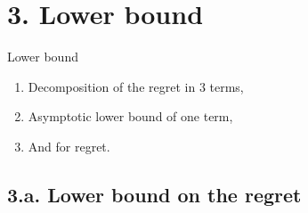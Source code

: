 \documentclass[12pt,english,ignorenonframetext,]{beamer}
\providecommand{\tightlist}{%
  \setlength{\itemsep}{0pt}\setlength{\parskip}{0pt}}
\begin{document}
\section{\hfill{}3. Lower bound\hfill{}}

\begin{frame}{Lower bound}

\begin{enumerate}
\def\labelenumi{\arabic{enumi}.}
\tightlist
\item
  Decomposition of the regret in \(3\) terms,\vspace*{15pt}
\item
  Asymptotic lower bound of one term,\vspace*{15pt}
\item
  And for regret.
\end{enumerate}

\end{frame}



\subsection{\hfill{}3.a. Lower bound on the regret\hfill{}}
\end{document}

